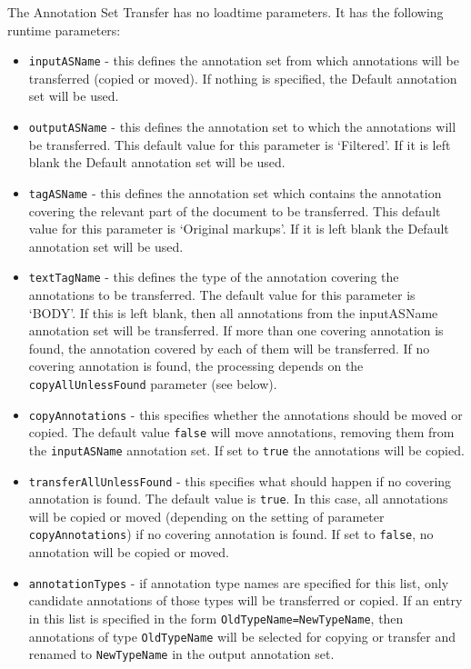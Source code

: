The Annotation Set Transfer has no loadtime parameters. It has the
following runtime parameters:
%
\begin{itemize}
\item
\texttt{inputASName} - this defines the annotation set from which annotations will be
transferred (copied or moved). 
If nothing is specified, the Default annotation set will
be used.
\item
\texttt{outputASName} - this defines the annotation set to which the annotations
will be transferred. This default value for this parameter is `Filtered'. If it 
is left blank the Default annotation set will be used.
\item
\texttt{tagASName} - this defines the annotation set which contains the
annotation covering the relevant part of the document to be
transferred. This default value for this parameter is `Original markups'. If it 
is left blank the Default annotation set will be used.
\item
\texttt{textTagName} - this defines the type of the annotation covering
the annotations to be transferred. The default value for this parameter is
`BODY'. If this is left blank, then all annotations from the inputASName 
annotation set will be transferred. If more than one covering annotation 
is found, the annotation covered by each of them will be transferred. If no 
covering annotation is found, the processing depends on the \texttt{copyAllUnlessFound} 
parameter (see below).
\item
\texttt{copyAnnotations} - this specifies whether the annotations should 
be moved or copied. The default value \texttt{false} will move annotations,
removing them from the \texttt{inputASName} annotation set. If set to 
\texttt{true} the annotations will be copied.
\item 
\texttt{transferAllUnlessFound} - this specifies what should happen if no covering
annotation is found. The default value is \texttt{true}. In this case, all
annotations will be copied or moved (depending on the setting of parameter
\texttt{copyAnnotations}) if no covering annotation is found.
If set to \texttt{false}, no annotation will be copied or moved.
\item \texttt{annotationTypes} - if annotation type names are specified
for this list, only candidate annotations of those types will be
transferred or copied. If an entry in this list is specified in the 
form \texttt{OldTypeName=NewTypeName}, then annotations of type 
\texttt{OldTypeName} will be selected for copying or transfer and 
renamed to \texttt{NewTypeName} in the output annotation set.
\end{itemize}
